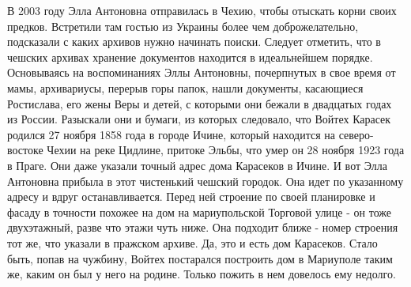 В 2003 году Элла Антоновна отправилась в Чехию, чтобы отыскать корни своих
предков. Встретили там гостью из Украины более чем доброжелательно, подсказали
с каких архивов нужно начинать поиски. Следует отметить, что в чешских архивах
хранение документов находится в идеальнейшем порядке. Основываясь на
воспоминаниях Эллы Антоновны, почерпнутых в свое время от мамы, архивариусы,
перерыв горы папок, нашли документы, касающиеся Ростислава, его жены Веры и
детей, с которыми они бежали в двадцатых годах из России. Разыскали они и
бумаги, из которых следовало, что Войтех Карасек родился 27 ноября 1858 года в
городе Ичине, который находится на северо-востоке Чехии на реке Цидлине,
притоке Эльбы, что умер он 28 ноября 1923 года в Праге. Они даже указали точный
адрес дома Карасеков в Ичине. И вот Элла Антоновна прибыла в этот чистенький
чешский городок. Она идет по указанному адресу и вдруг останавливается. Перед
ней строение по своей планировке и фасаду в точности похожее на дом на
мариупольской Торговой улице - он тоже двухэтажный, разве что этажи чуть ниже.
Она подходит ближе - номер строения тот же, что указали в пражском архиве. Да,
это и есть дом Карасеков. Стало быть, попав на чужбину, Войтех постарался
построить дом в Мариуполе таким же, каким он был у него на родине. Только
пожить в нем довелось ему недолго.
